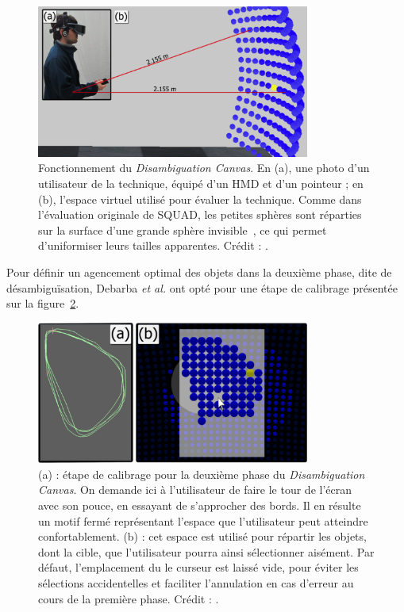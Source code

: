 	\begin{figure}[!htb]
		\centering
		\includegraphics[width=0.80\textwidth]{figures/ch2/dCanvas2}
		\caption[\emph{Disambiguation Canvas}, bis]{Fonctionnement du \emph{Disambiguation Canvas}. En (a), une photo d'un utilisateur de la technique, équipé d'un HMD et d'un pointeur ; en (b), l'espace virtuel utilisé pour évaluer la technique. Comme dans l'évaluation originale de SQUAD, les petites sphères sont réparties sur la surface d'une grande sphère invisible~\cite{kopper2011rapid}, ce qui permet d'uniformiser leurs tailles apparentes. Crédit : \cite{debarba2013disambiguation}.}
		\label{fig:dCanvas2}
	\end{figure}
	
	Pour définir un agencement optimal des objets dans la deuxième phase, dite de désambiguïsation, Debarba \emph{et al.} ont opté pour une étape de calibrage présentée sur la figure~\ref{fig:dCanvasLayout}.
	
	\begin{figure}[!htb]
		\centering
		\includegraphics[width=0.8\textwidth]{figures/ch2/dCanvasLayout}
		\caption[\emph{Disambiguation Canvas} -- calibrage]{(a) : étape de calibrage pour la deuxième phase du \emph{Disambiguation Canvas}. On demande ici à l'utilisateur de faire le tour de l'écran avec son pouce, en essayant de s'approcher des bords. Il en résulte un motif fermé représentant l'espace que l'utilisateur peut atteindre confortablement. (b) : cet espace est utilisé pour répartir les objets, dont la cible, que l'utilisateur pourra ainsi sélectionner aisément. Par défaut, l'emplacement du le curseur est laissé vide, pour éviter les sélections accidentelles et faciliter l'annulation en cas d'erreur au cours de la première phase. Crédit : \cite{debarba2013disambiguation}.}
		\label{fig:dCanvasLayout}
	\end{figure}
	

